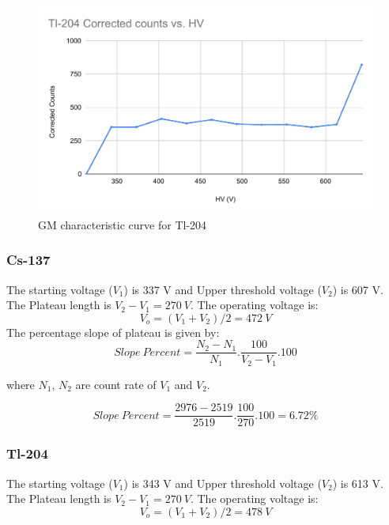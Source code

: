 \documentclass[a4paper, amsfonts, amssymb, amsmath, reprint, showkeys, nofootinbib, twoside]{revtex4-1}
\begin{document}
\begin{figure}[H]
	\centering
	\includegraphics[scale=0.4]{tl1} 
	\caption{GM characteristic curve for Tl-204}
	\label{tl1}
\end{figure}

\subsubsection*{Cs-137}
The starting voltage ($V_1$) is 337 V and Upper threshold voltage ($V_2$) is 607 V. The Plateau length is $V_2-V_1=270~V$. The operating voltage is:
\begin{equation}
	V_o=(V_1+V_2)/2=472~ V
\end{equation}
 The percentage slope of plateau is given by:
 \begin{equation}
 	Slope~Percent=\frac{N_2-N_1}{N_1}.\frac{100}{V_2-V_1}.100
 \end{equation}

where $N_1$, $N_2$ are count rate of  $V_1$ and $V_2$.

 \begin{equation}
	Slope~Percent=\frac{2976-2519}{2519}.\frac{100}{270}.100=6.72\%
\end{equation}

\subsubsection*{Tl-204}

The starting voltage ($V_1$) is 343 V and Upper threshold voltage ($V_2$) is 613 V. The Plateau length is $V_2-V_1=270~V$. The operating voltage is:
\begin{equation}
	V_o=(V_1+V_2)/2=478~ V
\end{equation}
\end{document}
